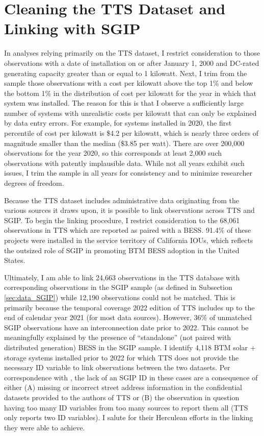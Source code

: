\section{Cleaning the TTS Dataset and Linking with SGIP}\label{apdx:TTS_SGIP_linking}

In analyses relying primarily on the TTS dataset, I restrict consideration to those observations with a date of installation on or after January 1\Xst, 2000 and DC-rated generating capacity greater than or equal to 1 kilowatt. Next, I trim from the sample those observations with a cost per kilowatt above the top 1\% and below the bottom 1\% in the distribution of cost per kilowatt for the year in which that system was installed. The reason for this is that I observe a sufficiently large number of systems with unrealistic costs per kilowatt that can only be explained by data entry errors. For example, for systems installed in 2020, the first percentile of cost per kilowatt is \$4.2 per kilowatt, which is nearly three orders of magnitude smaller than the median (\$3.85 per watt). There are over 200,000 observations for the year 2020, so this corresponds at least 2,000 such observations with patently implausible data. While not all years exhibit such issues, I trim the sample in all years for consistency and to minimize researcher degrees of freedom.

Because the TTS dataset includes administrative data originating from the various sources it draws upon, it is possible to link observations across TTS and SGIP. To begin the linking procedure, I restrict consideration to the 68,061 observations in TTS which are reported as paired with a BESS. 91.4\% of these projects were installed in the service territory of California IOUs, which reflects the outsized role of SGIP in promoting BTM BESS adoption in the United States.

Ultimately, I am able to link 24,663 observations in the TTS database with corresponding observations in the SGIP sample (as defined in Subsection \ref{sec:data_SGIP}) while 12,190 observations could not be matched. This is primarily because the temporal coverage 2022 edition of TTS includes up to the end of calendar year 2021 (for most data sources). However, 36\% of unmatched SGIP observations have an interconnection date prior to 2022. This cannot be meaningfully explained by the presence of ``standalone'' (not paired with distributed generation) BESS in the SGIP sample. I identify 4,118 BTM solar + storage systems installed prior to 2022 for which TTS does not provide the necessary ID variable to link observations between the two datasets. Per correspondence with \citeauthor{TTS2022}, the lack of an SGIP ID in these cases are a consequence of either (A) missing or incorrect street address information in the confidential datasets provided to the authors of TTS or (B) the observation in question having too many ID variables from too many sources to report them all (TTS only reports two ID variables). I salute \citeauthor{TTS2022} for their Herculean efforts in the linking they were able to achieve.

